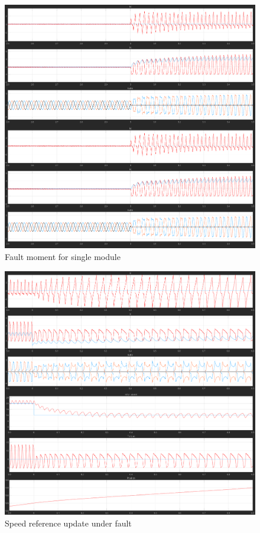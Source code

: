 \documentclass{article}
\begin{document}
\begin{figure}[h!]
\centering
\includegraphics[scale=0.3]{Figures/SingleModule/FaultMoment.png}
\caption{Fault moment for single module}
\label{fig:fault_moment}
\end{figure}

\begin{figure}[h!]
\centering
\includegraphics[scale=0.3]{Figures/SingleModule/SpeedRefUpdateUnderFault.png}
\caption{Speed reference update under fault}
\label{fig:ref_update_under_fault}
\end{figure}
\end{document}
